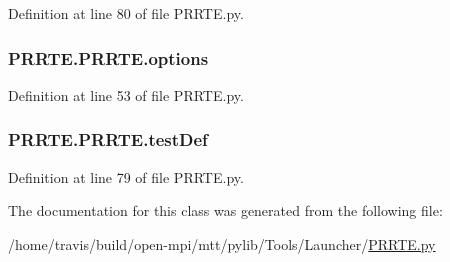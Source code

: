 Definition at line 80 of file P\-R\-R\-T\-E.\-py.

\hypertarget{class_p_r_r_t_e_1_1_p_r_r_t_e_a174321352f6234d4704b9a980574bdc7}{
\subsubsection[{options}]{\setlength{\rightskip}{0pt plus 5cm}P\-R\-R\-T\-E.\-P\-R\-R\-T\-E.\-options}}\label{class_p_r_r_t_e_1_1_p_r_r_t_e_a174321352f6234d4704b9a980574bdc7}


Definition at line 53 of file P\-R\-R\-T\-E.\-py.

\hypertarget{class_p_r_r_t_e_1_1_p_r_r_t_e_a797f27c656051565b7897358a7c28a40}{
\subsubsection[{test\-Def}]{\setlength{\rightskip}{0pt plus 5cm}P\-R\-R\-T\-E.\-P\-R\-R\-T\-E.\-test\-Def}}\label{class_p_r_r_t_e_1_1_p_r_r_t_e_a797f27c656051565b7897358a7c28a40}


Definition at line 79 of file P\-R\-R\-T\-E.\-py.



The documentation for this class was generated from the following file\-:\begin{DoxyCompactItemize}
\item 
/home/travis/build/open-\/mpi/mtt/pylib/\-Tools/\-Launcher/\hyperlink{_p_r_r_t_e_8py}{P\-R\-R\-T\-E.\-py}\end{DoxyCompactItemize}
